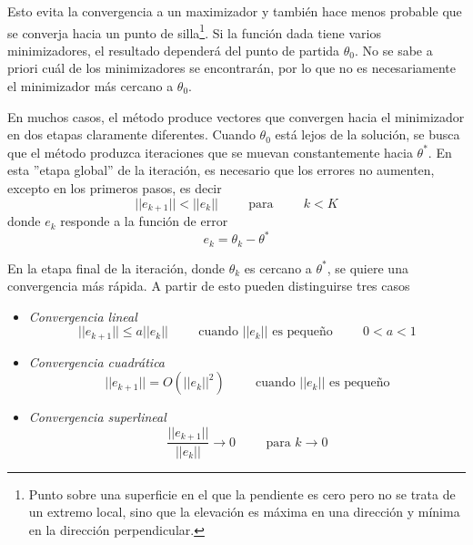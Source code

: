 Esto evita la convergencia a un maximizador y también hace menos probable que se converja hacia un punto de silla\footnote{Punto sobre una superficie en el que la pendiente es cero pero no se trata de un extremo local, sino que la elevación es máxima en una dirección y mínima en la dirección perpendicular.}. Si la función dada tiene varios minimizadores, el resultado dependerá del punto de partida $\theta_0$. No se sabe a priori cuál de los minimizadores se encontrarán, por lo que no es necesariamente el minimizador más cercano a $\theta_0$.

En muchos casos, el método produce vectores que convergen hacia el minimizador en dos etapas claramente diferentes. Cuando $\theta_0$ está lejos de la solución, se busca que el método produzca iteraciones que se muevan constantemente hacia $\theta^*$. En esta ''etapa global'' de la iteración, es necesario que los errores no aumenten, excepto en los primeros pasos, es decir
\begin{equation}
    ||e_{k+1}|| < ||e_k||\hspace{1cm}\text{para}\hspace{1cm}k<K
\end{equation}
donde $e_k$ responde a la función de error
\begin{equation}
    e_k = \theta_k - \theta^*
\end{equation}

En la etapa final de la iteración, donde $\theta_k$ es cercano a $\theta^*$, se quiere una convergencia más rápida. A partir de esto pueden distinguirse tres casos
\begin{itemize}
    \item \textit{Convergencia lineal}
    \begin{equation}
            ||e_{k+1}|| \leq a||e_k||\hspace{1cm}\text{cuando $||e_k||$ es pequeño}\hspace{1cm}0<a<1
    \end{equation}
    \item \textit{Convergencia cuadrática}
    \begin{equation}
        ||e_{k+1}||=O(||e_k||^2)\hspace{1cm}\text{cuando $||e_k||$ es pequeño}
    \end{equation}
    \item \textit{Convergencia superlineal}
    \begin{equation}
        \frac{||e_{k+1}||}{||e_k||}\rightarrow 0\hspace{1cm}\text{para $k\rightarrow 0$}
    \end{equation}
\end{itemize}

